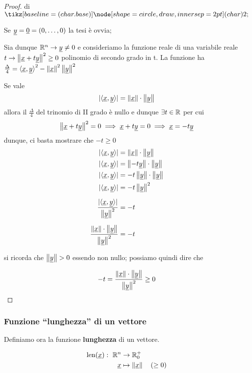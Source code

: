 \begin{proof} di \(\circled{2}\)

    Se \(\uy = \uzero = (0, \ldots ,0)\) la tesi è ovvia;

    Sia dunque \(\Rn \rightarrow \uy \neq 0\) e consideriamo la funzione reale di una variabile reale \(t \rightarrow \norm{\ux+t\uy}^{2}\ge 0\) polinomio di secondo grado in t.
    La funzione ha \(\frac{\Delta}{4} = {\prods{\ux}{\uy}}^{2} - \norm\ux^{2}\norm\uy^{2}\)

    \medskip

    Se vale
    \[|\prods{\ux}{\uy}| = \norm\ux \cdot \norm\uy \]
    allora il \(\frac{\Delta}{4}\) del trinomio di II grado è nullo e dunque \(\exists t \in \R \) per cui
    \[\norm{\ux+t\uy}^{2}=0 \implies \ux +t\uy=0 \implies \ux=-t\uy \]
    dunque, ci basta mostrare che \(-t \ge 0\)
    \begin{align*}
        |\prods{\ux}{\uy}|                           & = \norm\ux \cdot \norm\uy     \\
        |\prods{\ux}{\uy}|                           & = \norm{-t\uy} \cdot \norm\uy \\
        |\prods{\ux}{\uy}|                           & = -t\norm{\uy} \cdot \norm\uy \\
        |\prods{\ux}{\uy}|                           & = -t\norm\uy^{2}              \\[2mm]
        \frac{|\prods{\ux}{\uy}|}{\norm\uy^{2}}      & = -t                          \\[2mm]
        \frac{\norm\ux \cdot \norm\uy}{\norm\uy^{2}} & = -t
    \end{align*}

    si ricorda che \(\norm\uy>0\) essendo \uy{} non nullo; possiamo quindi dire che

    \[
        -t = \frac{\norm\ux \cdot \norm\uy}{\norm\uy^{2}} \ge 0
    \]

\end{proof}

\filbreak{}

\subsubsection{Funzione ``lunghezza'' di un vettore}

Definiamo ora la funzione \textbf{lunghezza} di un vettore.

\begin{align*}
    \text{len}(\ux): \ \Rn & \rightarrow \R_0^{+}            \\
    \ux                    & \mapsto \norm\ux \quad (\geq 0)
\end{align*}


